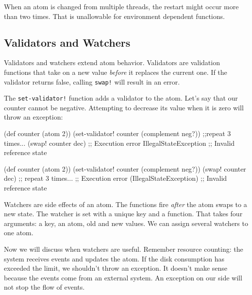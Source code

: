 When an atom is changed from multiple threads, the restart might occur more than two times.
That is unallowable for environment dependent functions.

\subsection{Validators and Watchers}


Validators and watchers extend atom behavior.
Validators are validation functions that take on a new value \emph{before} it replaces the current one.
If the validator returns false, calling \verb|swap!| will result in an error.


The \verb|set-validator!| function adds a validator to the atom.
Let's say that our counter cannot be negative.
Attempting to decrease its value when it is zero will throw an exception:

\ifx\DEVICETYPE\MOBILE

\begin{clojure}
(def counter (atom 2))
(set-validator!
  counter (complement neg?))
;;repeat 3 times...
(swap! counter dec)
;; Execution error IllegalStateException
;; Invalid reference state
\end{clojure}

\else

\begin{clojure}
(def counter (atom 2))
(set-validator! counter (complement neg?))
(swap! counter dec) ;; repeat 3 times...
;; Execution error (IllegalStateException)
;; Invalid reference state
\end{clojure}

\fi

Watchers are side effects of an atom.
The functions fire \emph{after} the atom swaps to a new state. The watcher is set with a unique key and a function.
That takes four arguments: a key, an atom, old and new values.
We can assign several watchers to one atom.

Now we will discuss when watchers are useful.
Remember resource counting: the system receives events and updates the atom.
If the disk consumption has exceeded the limit, we shouldn't throw an exception.
It doesn't make sense because the events come from an external system.
An exception on our side will not stop the flow of events.


